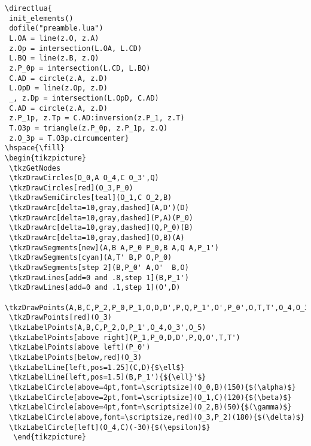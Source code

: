 \begin{verbatim}
\directlua{
 init_elements()
 dofile("preamble.lua")
 L.OA = line(z.O, z.A)
 z.Op = intersection(L.OA, L.CD)
 L.BQ = line(z.B, z.Q)
 z.P_0p = intersection(L.CD, L.BQ)
 C.AD = circle(z.A, z.D)
 L.OpD = line(z.Op, z.D)
 _, z.Dp = intersection(L.OpD, C.AD)
 C.AD = circle(z.A, z.D)
 z.P_1p, z.Tp = C.AD:inversion(z.P_1, z.T)
 T.O3p = triangle(z.P_0p, z.P_1p, z.Q)
 z.O_3p = T.O3p.circumcenter}
\hspace{\fill}
\begin{tikzpicture}
 \tkzGetNodes
 \tkzDrawCircles(O_0,A O_4,C O_3',Q)
 \tkzDrawCircles[red](O_3,P_0)
 \tkzDrawSemiCircles[teal](O_1,C O_2,B)
 \tkzDrawArc[delta=10,gray,dashed](A,D')(D)
 \tkzDrawArc[delta=10,gray,dashed](P,A)(P_0)
 \tkzDrawArc[delta=10,gray,dashed](Q,P_0)(B)
 \tkzDrawArc[delta=10,gray,dashed](O,B)(A)
 \tkzDrawSegments[new](A,B A,P_0 P_0,B A,Q A,P_1')
 \tkzDrawSegments[cyan](A,T' B,P O,P_0)
 \tkzDrawSegments[step 2](B,P_0' A,O'  B,O)
 \tkzDrawLines[add=0 and .8,step 1](B,P_1')
 \tkzDrawLines[add=0 and .1,step 1](O',D)
 \tkzDrawPoints(A,B,C,P_2,P_0,P_1,O,D,D',P,Q,P_1',O',P_0',O,T,T',O_4,O_3',O_5)
 \tkzDrawPoints[red](O_3)
 \tkzLabelPoints(A,B,C,P_2,O,P_1',O_4,O_3',O_5)
 \tkzLabelPoints[above right](P_1,P_0,D,D',P,Q,O',T,T')
 \tkzLabelPoints[above left](P_0')
 \tkzLabelPoints[below,red](O_3)
 \tkzLabelLine[left,pos=1.25](C,D){$\ell$}
 \tkzLabelLine[left,pos=1.5](B,P_1'){${\ell}'$}
 \tkzLabelCircle[above=4pt,font=\scriptsize](O_0,B)(150){$(\alpha)$}
 \tkzLabelCircle[above=2pt,font=\scriptsize](O_1,C)(120){$(\beta)$}
 \tkzLabelCircle[above=4pt,font=\scriptsize](O_2,B)(50){$(\gamma)$}
 \tkzLabelCircle[above,font=\scriptsize,red](O_3,P_2)(180){$(\delta)$}
 \tkzLabelCircle[left](O_4,C)(-30){$(\epsilon)$}
  \end{tikzpicture}
\end{verbatim}


